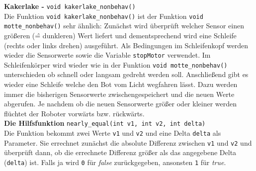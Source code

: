\noindent \textbf{Kakerlake - }\verb+void kakerlake_nonbehav()+\\

Die Funktion \verb+void kakerlake_nonbehav()+ ist der Funktion \verb+void motte_nonbehav()+ sehr ähnlich:
Zunächst wird überprüft welcher Sensor einen größeren (\^= dunkleren) Wert liefert und dementsprechend wird eine Schleife (rechts oder links drehen) ausgeführt. Als Bedingungen im Schleifenkopf werden wieder die Sensorwerte sowie die Variable \verb+stopMotor+ verwendet. Im Schleifenkörper wird wieder wie in der Funktion \verb+void motte_nonbehav()+ unterschieden ob schnell oder langsam gedreht werden soll.
Anschließend gibt es wieder eine Schleife welche den Bot vom Licht wegfahren lässt. Dazu werden immer die bisherigen Sensorwerte zwischengespeichert und die neuen Werte abgerufen. Je nachdem ob die neuen Sensorwerte größer oder kleiner werden flüchtet der Roboter vorwärts bzw. rückwärts.\\

\noindent \textbf{Die Hilfsfunktion }\verb+nearly_equal(int v1, int v2, int delta)+\\

Die Funktion bekommt zwei Werte \verb+v1+ und \verb+v2+ und eine Delta \verb+delta+ als Parameter. Sie errechnet zunächst die absolute Differenz zwischen  \verb+v1+ und \verb+v2+ und überprüft dann, ob die errechnete Differenz größer als das angegebene Delta (\verb+delta+) ist. Falls ja wird \verb+0+ für \textit{false} zurückgegeben, ansonsten \verb+1+ für \textit{true}.

